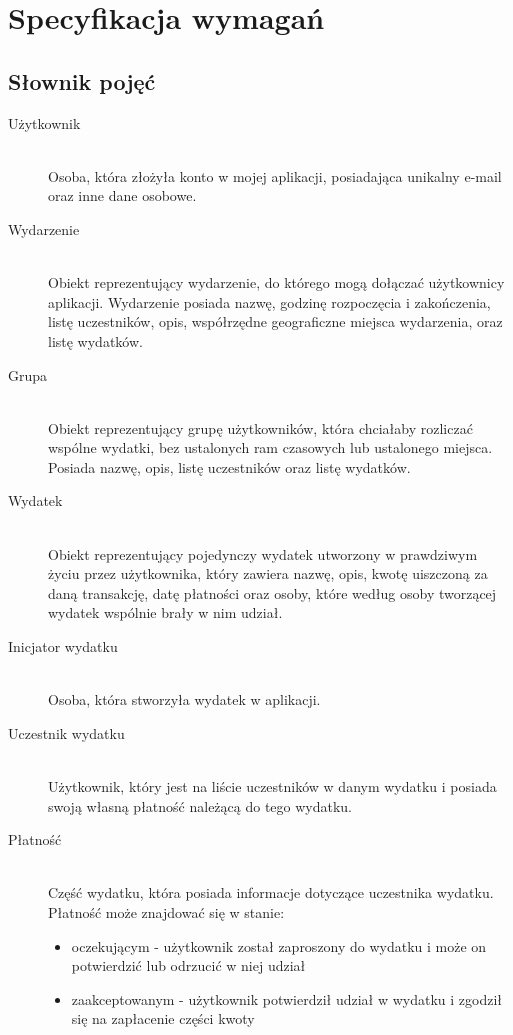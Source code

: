 \newpage %

\section{Specyfikacja wymagań}
\subsection{Słownik pojęć}
\begin{description}
  \item[Użytkownik] \hfill \\ Osoba, która złożyła konto w mojej aplikacji, posiadająca unikalny e-mail oraz inne dane osobowe.
  \item[Wydarzenie] \hfill \\ Obiekt reprezentujący wydarzenie, do którego mogą dołączać użytkownicy aplikacji. Wydarzenie posiada nazwę, godzinę rozpoczęcia i zakończenia, listę uczestników, opis, współrzędne geograficzne miejsca wydarzenia, oraz listę wydatków.
  \item[Grupa] \hfill \\ Obiekt reprezentujący grupę użytkowników, która chciałaby rozliczać wspólne wydatki, bez ustalonych ram czasowych lub ustalonego miejsca. Posiada nazwę, opis, listę uczestników oraz listę wydatków.
  \item[Wydatek] \hfill \\ Obiekt reprezentujący pojedynczy wydatek utworzony w prawdziwym życiu przez użytkownika, który zawiera nazwę, opis, kwotę uiszczoną za daną transakcję, datę płatności oraz osoby, które według osoby tworzącej wydatek wspólnie brały w nim udział.
  \item[Inicjator wydatku] \hfill \\ Osoba, która stworzyła wydatek w aplikacji.
  \item[Uczestnik wydatku] \hfill \\ Użytkownik, który jest na liście uczestników w danym wydatku i posiada swoją własną płatność należącą do tego wydatku.
  \item[Płatność] \hfill \\ Część wydatku, która posiada informacje dotyczące uczestnika wydatku. Płatność może znajdować się w stanie:
    \begin{itemize}
    \item oczekującym - użytkownik został zaproszony do wydatku i może on potwierdzić lub odrzucić w niej udział
    \item zaakceptowanym - użytkownik potwierdził udział w wydatku i zgodził się na zapłacenie części kwoty

\end{itemize}
\end{description}

